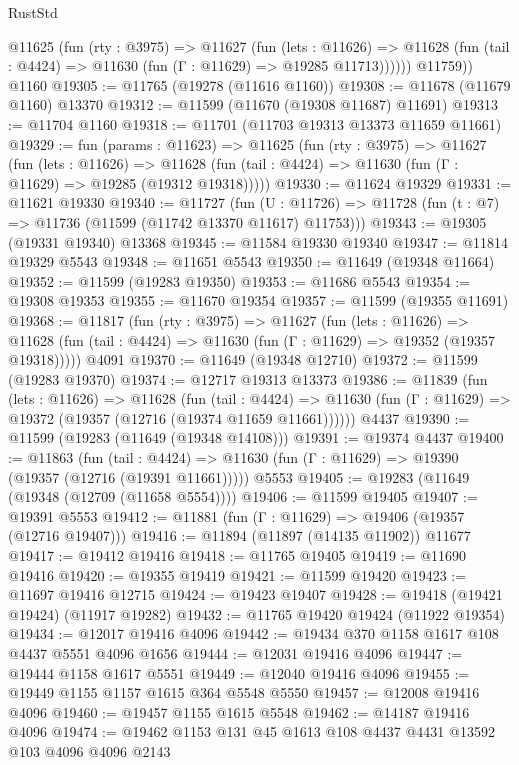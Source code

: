 \begin{lexlean}{RustStd}
\begin{coremodule}
          @11625
            (fun (rty : @3975) =>
            @11627
              (fun (lets : @11626) =>
              @11628 (fun (tail : @4424) => @11630 (fun (Γ : @11629) => @19285 @11713))))))
        @11759))
    @1160
@19305 := @11765 (@19278 (@11616 @1160))
@19308 := @11678 (@11679 @1160) @13370
@19312 := @11599 (@11670 (@19308 @11687) @11691)
@19313 := @11704 @1160
@19318 := @11701 (@11703 @19313 @13373 @11659 @11661)
@19329 := fun (params : @11623) =>
  @11625
    (fun (rty : @3975) =>
    @11627
      (fun (lets : @11626) =>
      @11628 (fun (tail : @4424) => @11630 (fun (Γ : @11629) => @19285 (@19312 @19318)))))
@19330 := @11624 @19329
@19331 := @11621 @19330
@19340 := @11727
    (fun (U : @11726) => @11728 (fun (t : @7) => @11736 (@11599 (@11742 @13370 @11617) @11753)))
@19343 := @19305 (@19331 @19340) @13368
@19345 := @11584 @19330 @19340
@19347 := @11814 @19329 @5543
@19348 := @11651 @5543
@19350 := @11649 (@19348 @11664)
@19352 := @11599 (@19283 @19350)
@19353 := @11686 @5543
@19354 := @19308 @19353
@19355 := @11670 @19354
@19357 := @11599 (@19355 @11691)
@19368 := @11817
    (fun (rty : @3975) =>
    @11627
      (fun (lets : @11626) =>
      @11628 (fun (tail : @4424) => @11630 (fun (Γ : @11629) => @19352 (@19357 @19318)))))
    @4091
@19370 := @11649 (@19348 @12710)
@19372 := @11599 (@19283 @19370)
@19374 := @12717 @19313 @13373
@19386 := @11839
    (fun (lets : @11626) =>
    @11628
      (fun (tail : @4424) =>
      @11630 (fun (Γ : @11629) => @19372 (@19357 (@12716 (@19374 @11659 @11661))))))
    @4437
@19390 := @11599 (@19283 (@11649 (@19348 @14108)))
@19391 := @19374 @4437
@19400 := @11863
    (fun (tail : @4424) => @11630 (fun (Γ : @11629) => @19390 (@19357 (@12716 (@19391 @11661)))))
    @5553
@19405 := @19283 (@11649 (@19348 (@12709 (@11658 @5554))))
@19406 := @11599 @19405
@19407 := @19391 @5553
@19412 := @11881 (fun (Γ : @11629) => @19406 (@19357 (@12716 @19407)))
@19416 := @11894 (@11897 (@14135 @11902)) @11677
@19417 := @19412 @19416
@19418 := @11765 @19405
@19419 := @11690 @19416
@19420 := @19355 @19419
@19421 := @11599 @19420
@19423 := @11697 @19416 @12715
@19424 := @19423 @19407
@19428 := @19418 (@19421 @19424) (@11917 @19282)
@19432 := @11765 @19420 @19424 (@11922 @19354)
@19434 := @12017 @19416 @4096
@19442 := @19434 @370 @1158 @1617 @108 @4437 @5551 @4096 @1656
@19444 := @12031 @19416 @4096
@19447 := @19444 @1158 @1617 @5551
@19449 := @12040 @19416 @4096
@19455 := @19449 @1155 @1157 @1615 @364 @5548 @5550
@19457 := @12008 @19416 @4096
@19460 := @19457 @1155 @1615 @5548
@19462 := @14187 @19416 @4096
@19474 := @19462 @1153 @131 @45 @1613 @108 @4437 @4431 @13592 @103 @4096 @4096 @2143

\end{coremodule}
\end{lexlean}

